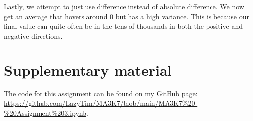 \documentclass[11pt]{article}
\begin{document}
Lastly, we attempt to just use difference instead of absolute difference. We now get an average that hovers around 0 but has a high variance. This is because our final value can quite often be in the tens of thousands in both the positive and negative directions. 


\section*{Supplementary material}
The code for this assignment can be found on my GitHub page:  \url{https://github.com/LazyTim/MA3K7/blob/main/MA3K7%20-%20Assignment%203.ipynb}.
\end{document}
